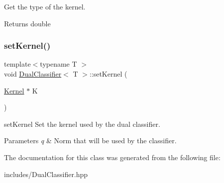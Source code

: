 Get the type of the kernel. 

\begin{DoxyReturn}{Returns}
double 
\end{DoxyReturn}
\mbox{\label{class_dual_classifier_a4f4cc830f9f9723592dc92957aec5d48}} 
\subsubsection{\texorpdfstring{set\+Kernel()}{setKernel()}}
{\footnotesize\ttfamily template$<$typename T $>$ \\
void \hyperlink{class_dual_classifier}{Dual\+Classifier}$<$ T $>$\+::set\+Kernel (\begin{DoxyParamCaption}\item[{\hyperlink{class_kernel}{Kernel} $\ast$}]{K }\end{DoxyParamCaption})\hspace{0.3cm}{\ttfamily [inline]}}



set\+Kernel Set the kernel used by the dual classifier. 


\begin{DoxyParams}{Parameters}
{\em q} & Norm that will be used by the classifier. \\
\hline
\end{DoxyParams}


The documentation for this class was generated from the following file\+:\begin{DoxyCompactItemize}
\item 
includes/Dual\+Classifier.\+hpp\end{DoxyCompactItemize}
